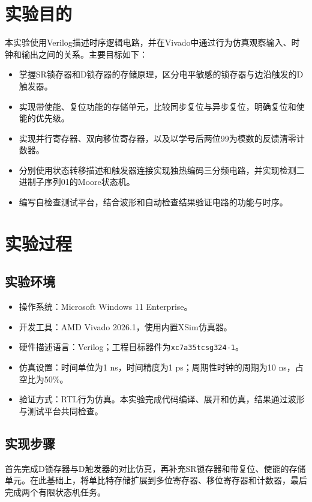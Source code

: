 \documentclass[12pt,a4paper]{ctexart}
\title{\reporttitle}
\author{姓名：\authname\quad 班级：\class\\学号：\authid}
\date{2026年11月11日}
\begin{document}
\maketitle
\tableofcontents
\newpage

\section{实验目的}
本实验使用Verilog描述时序逻辑电路，并在Vivado中通过行为仿真观察输入、时钟和输出之间的关系。主要目标如下：
\begin{itemize}
  \item 掌握SR锁存器和D锁存器的存储原理，区分电平敏感的锁存器与边沿触发的D触发器。
  \item 实现带使能、复位功能的存储单元，比较同步复位与异步复位，明确复位和使能的优先级。
  \item 实现并行寄存器、双向移位寄存器，以及以学号后两位99为模数的反馈清零计数器。
  \item 分别使用状态转移描述和触发器连接实现独热编码三分频电路，并实现检测二进制子序列01的Moore状态机。
  \item 编写自检查测试平台，结合波形和自动检查结果验证电路的功能与时序。
\end{itemize}

\section{实验过程}
\subsection{实验环境}
\begin{itemize}
  \item 操作系统：Microsoft Windows 11 Enterprise。
  \item 开发工具：AMD Vivado 2026.1，使用内置XSim仿真器。
  \item 硬件描述语言：Verilog；工程目标器件为\texttt{xc7a35tcsg324-1}。
  \item 仿真设置：时间单位为1 ns，时间精度为1 ps；周期性时钟的周期为10 ns，占空比为50\%。
  \item 验证方式：RTL行为仿真。本实验完成代码编译、展开和仿真，结果通过波形与测试平台共同检查。
\end{itemize}

\subsection{实现步骤}
首先完成D锁存器与D触发器的对比仿真，再补充SR锁存器和带复位、使能的存储单元。在此基础上，将单比特存储扩展到多位寄存器、移位寄存器和计数器，最后完成两个有限状态机任务。
\end{document}
